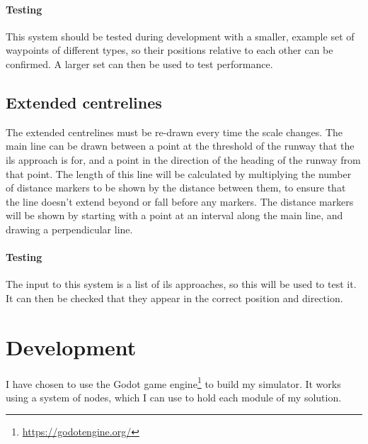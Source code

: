 \documentclass{article}
\begin{document}
\paragraph{Testing}
This system should be tested during development with a smaller, example set of waypoints of different types, so their positions relative to each other can be confirmed.
A larger set can then be used to test performance.

\subsection{Extended centrelines}
The extended centrelines must be re-drawn every time the scale changes.
The main line can be drawn between a point at the threshold of the runway that the \acrshort{ils} approach is for, and a point in the direction of the heading of the runway from that point.
The length of this line will be calculated by multiplying the number of distance markers to be shown by the distance between them, to ensure that the line doesn't extend beyond or fall before any markers.
The distance markers will be shown by starting with a point at an interval along the main line, and drawing a perpendicular line.

\paragraph{Testing}
The input to this system is a list of \acrshort{ils} approaches, so this will be used to test it.
It can then be checked that they appear in the correct position and direction.

\clearpage
\section{Development}
I have chosen to use the Godot game engine\footnote{\url{https://godotengine.org/}} to build my simulator.
It works using a system of nodes, which I can use to hold each module of my solution.
\end{document}
